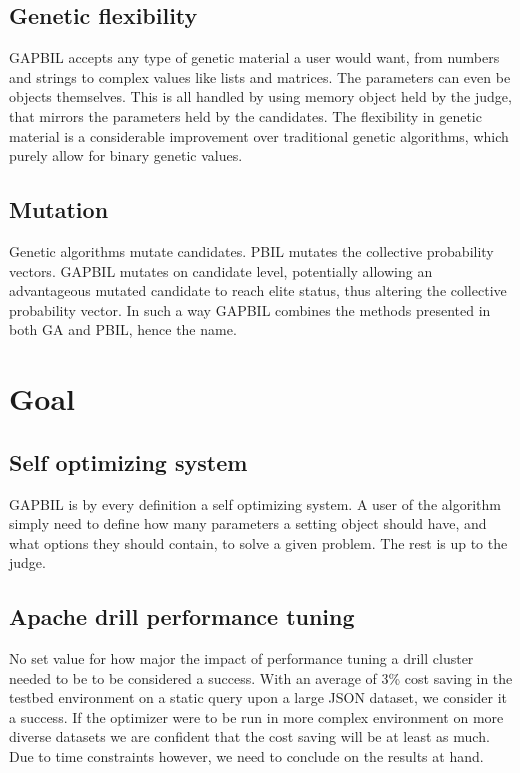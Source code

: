 \documentclass[a4paper,english]{report}
\begin{document}
		\subsection{Genetic flexibility}
		GAPBIL accepts any type of genetic material a user would want, from numbers and strings to complex values like lists and matrices. The parameters can even be objects themselves. This is all handled by using memory object held by the judge, that mirrors the parameters held by the candidates. The flexibility in genetic material is a considerable improvement over traditional genetic algorithms, which purely allow for binary genetic values.
		\subsection{Mutation}
		Genetic algorithms mutate candidates. PBIL mutates the collective probability vectors. GAPBIL mutates on candidate level, potentially allowing an advantageous mutated candidate to reach elite status, thus altering the collective probability vector. In such a way GAPBIL combines the methods presented in both GA and PBIL, hence the name.
		\clearpage
		\section{Goal}
		\subsection{Self optimizing system}
		GAPBIL is by every definition a self optimizing system. A user of the algorithm simply need to define how many parameters a setting object should have, and what options they should contain, to solve a given problem. The rest is up to the judge.
		\subsection{Apache drill performance tuning}
		No set value for how major the impact of performance tuning a drill cluster needed to be to be considered a success. With an average of 3\% cost saving in the testbed environment on a static query upon a large JSON dataset, we consider it a success. If the optimizer were to be run in more complex environment on more diverse datasets we are confident that the cost saving will be at least as much. Due to time constraints however, we need to conclude on the results at hand.
\end{document}
